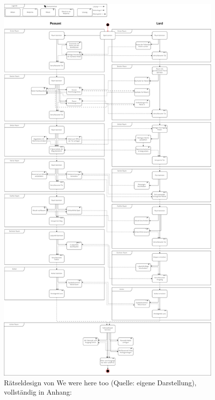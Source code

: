 \begin{figure}[ht]
\centering
\includegraphics[width=0.8\linewidth]{content/pictures/WeWereHereTooUML.png}
\caption{Rätseldesign von We were here too (Quelle: eigene Darstellung), vollständig in Anhang: }
\label{fig:wwht-uml}
\end{figure}

